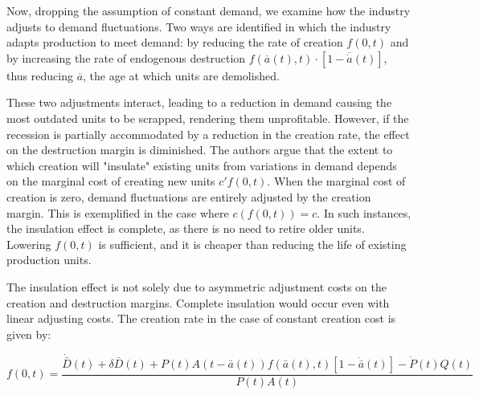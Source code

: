 \documentclass[12pt]{report}
\begin{document}
Now, dropping the assumption of constant demand, we examine how the industry adjusts to demand fluctuations. Two ways
are identified in which the industry adapts production to meet demand: by reducing the rate of creation \(f(0,t)\) and
by increasing the rate of endogenous destruction \(f(\overline{a}(t),t) \cdot [1-\overline{\dot{a}}(t)]\), thus reducing
\(\overline{a}\), the age at which units are demolished. 

These two adjustments interact, leading to a reduction in demand causing the most outdated units to be scrapped,
rendering them unprofitable. However, if the recession is partially accommodated by a reduction in the creation rate,
the effect on the destruction margin is diminished. The authors argue that the extent to which creation will "insulate"
existing units from variations in demand depends on the marginal cost of creating new units \(c'f(0,t)\). When the
marginal cost of creation is zero, demand fluctuations are entirely adjusted by the creation margin. This is exemplified
in the case where \(c(f(0,t)) = c\). In such instances, the insulation effect is complete, as there is no need to retire
older units. Lowering \(f(0,t)\) is sufficient, and it is cheaper than reducing the life of existing production units. 

The insulation effect is not solely due to asymmetric adjustment costs on the creation and destruction margins. Complete
insulation would occur even with linear adjusting costs. The creation rate in the case of constant creation cost is
given by: 

\[\label{eq_2.10} f(0, t) = \frac{\dot{\bar{D}}(t) + \delta \bar{D}(t) + P(t) A(t - \bar{a}(t)) f(\bar{a}(t), t)[1 -
\dot{\bar{a}}(t)] - \dot{P}(t) Q(t)}{P(t) A(t)}\] 
\end{document}
